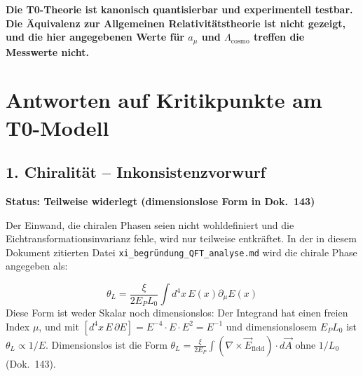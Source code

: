\noindent
{}

\vspace{1cm}

\noindent
\textbf{ Die T0-Theorie ist kanonisch quantisierbar und experimentell testbar. Die Äquivalenz zur Allgemeinen Relativitätstheorie ist nicht gezeigt, und die hier angegebenen Werte für $a_\mu$ und $\Lambda_{\text{cosmo}}$ treffen die Messwerte nicht.}	

\section{Antworten auf Kritikpunkte am T0-Modell}

\subsection{1. Chiralität – Inkonsistenzvorwurf}
\textbf{Status: Teilweise widerlegt (dimensionslose Form in Dok.~143)}
	
	Der Einwand, die chiralen Phasen seien nicht wohldefiniert und die Eichtransformationsinvarianz fehle, wird nur teilweise entkräftet. In der in diesem Dokument zitierten Datei \texttt{xi\_begründung\_QFT\_analyse.md} wird die chirale Phase angegeben als:

\[
\theta_L = \frac{\xi}{2E_P L_0} \int d^4x\, E(x) \partial_\mu E(x)
\]
Diese Form ist weder Skalar noch dimensionslos: Der Integrand hat einen freien Index $\mu$, und mit $[d^4x\,E\,\partial E] = E^{-4}\cdot E\cdot E^2 = E^{-1}$ und dimensionslosem $E_P L_0$ ist $\theta_L \propto 1/E$. Dimensionslos ist die Form $\theta_L = \frac{\xi}{2E_P}\int (\nabla \times \vec{E}_{\text{field}}) \cdot d\vec{A}$ ohne $1/L_0$ (Dok.~143).

